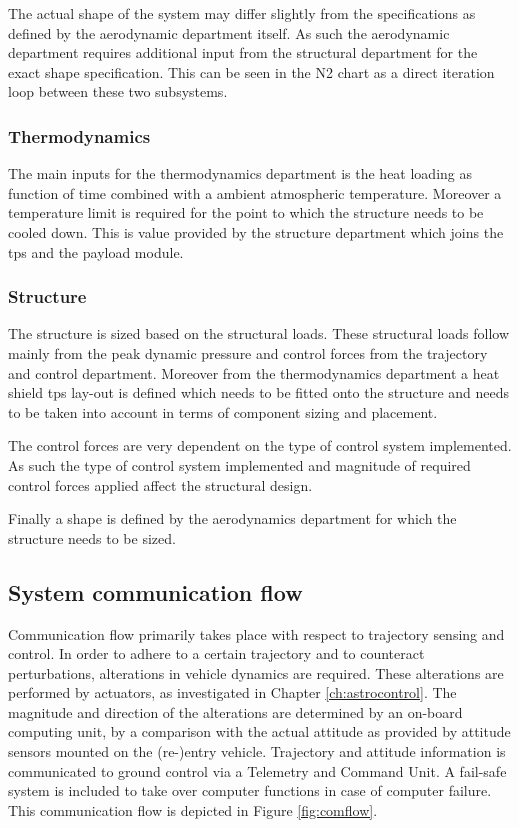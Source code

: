 The actual shape of the system may differ slightly from the specifications as defined by the aerodynamic department itself. As such the aerodynamic department requires additional input from the structural department for the exact shape specification. This can be seen in the N2 chart as a direct iteration loop between these two subsystems.

\subsubsection{Thermodynamics}
The main inputs for the thermodynamics department is the heat loading as function of time combined with a ambient atmospheric temperature. Moreover a temperature limit is required for the point to which the structure needs to be cooled down. This is value provided by the structure department which joins the \gls{tps} and the payload module.

\subsubsection{Structure}

The structure is sized based on the structural loads. These structural loads follow mainly from the peak dynamic pressure and control forces from the trajectory and control department. Moreover from the thermodynamics department a heat shield \gls{tps} lay-out is defined which needs to be fitted onto the structure and needs to be taken into account in terms of component sizing and placement.

The control forces are very dependent on the type of control system implemented. As such the type of control system implemented and magnitude of required control forces applied affect the structural design.

Finally a shape is defined by the aerodynamics department for which the structure needs to be sized. 

\subsection{System communication flow} \label{sec:comflow}
Communication flow primarily takes place with respect to trajectory sensing and control. In order to adhere to a certain trajectory and to counteract perturbations, alterations in vehicle dynamics are required. These alterations are performed by actuators, as investigated in Chapter \ref{ch:astrocontrol}. The magnitude and direction of the alterations are determined by an on-board computing unit, by a comparison with the actual attitude as provided by attitude sensors mounted on the (re-)entry vehicle. Trajectory and attitude information is communicated to ground control via a Telemetry and Command Unit. A fail-safe system is included to take over computer functions in case of computer failure. This communication flow is depicted in Figure  \ref{fig:comflow}.

